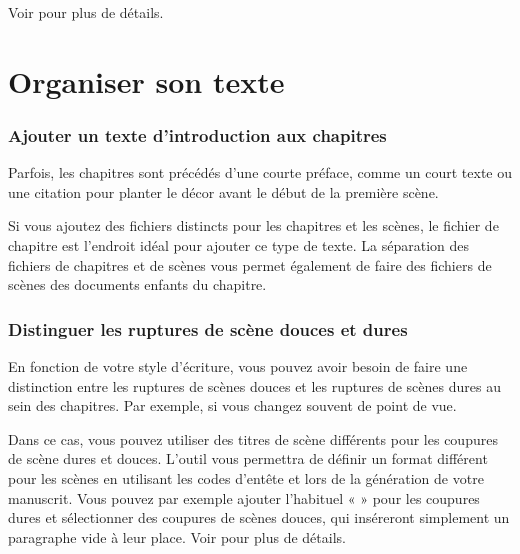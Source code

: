 \documentclass[a4paper,11pt,french]{sphinxmanual}
\begin{document}
\sphinxAtStartPar
Voir {\hyperref[\detokenize{usage_format:a-fmt-align}]{}} pour plus de détails.


\section{Organiser son texte}
\label{\detokenize{int_howto:organising-your-text}}\subsubsection*{Ajouter un texte d’introduction aux chapitres}

\sphinxAtStartPar
Parfois, les chapitres sont précédés d’une courte préface, comme un court texte ou une citation pour planter le décor avant le début de la première scène.

\sphinxAtStartPar
Si vous ajoutez des fichiers distincts pour les chapitres et les scènes, le fichier de chapitre est l’endroit idéal pour ajouter ce type de texte. La séparation des fichiers de chapitres et de scènes vous permet également de faire des fichiers de scènes des documents enfants du chapitre.
\subsubsection*{Distinguer les ruptures de scène douces et dures}

\sphinxAtStartPar
En fonction de votre style d’écriture, vous pouvez avoir besoin de faire une distinction entre les ruptures de scènes douces et les ruptures de scènes dures au sein des chapitres. Par exemple, si vous changez souvent de point de vue.

\sphinxAtStartPar
Dans ce cas, vous pouvez utiliser des titres de scène différents pour les coupures de scène dures et douces. L’outil  vous permettra de définir un format différent pour les scènes en utilisant les codes d’en\sphinxhyphen{}tête \sphinxcode{\sphinxupquote{\#\#\#}} et \sphinxcode{\sphinxupquote{\#\#\#!}} lors de la génération de votre manuscrit. Vous pouvez par exemple ajouter l’habituel « \sphinxcode{\sphinxupquote{* * *}} » pour les coupures dures et sélectionner des coupures de scènes douces, qui inséreront simplement un paragraphe vide à leur place. Voir {\hyperref[\detokenize{project_manuscript:a-manuscript-settings}]{}} pour plus de détails.
\end{document}
